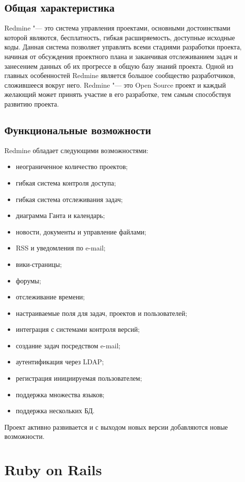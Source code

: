 \subsection{Общая характеристика}
Redmine \cite{redmine} "--- это система управления проектами, основными
достоинствами которой являются, бесплатность, гибкая расширяемость, доступные
исходные коды. Данная система позволяет управлять всеми стадиями разработки
проекта, начиная от обсуждения проектного плана и заканчивая отслеживанием
задач и занесением данных об их прогрессе в общую базу знаний проекта. Одной из
главных особенностей Redmine является большое сообщество разработчиков,
сложившееся вокруг него. Redmine "--- это Open Source проект и каждый желающий
может принять участие в его разработке, тем самым способствуя развитию проекта.

\subsection{Функциональные возможности}
Redmine обладает следующими возможностями:
\begin{itemize}
  \item неограниченное количество проектов;
  \item гибкая система контроля доступа;
  \item гибкая система отслеживания задач;
  \item диаграмма Ганта и календарь;
  \item новости, документы и управление файлами;
  \item RSS и уведомления по e-mail;
  \item вики-страницы;
  \item форумы;
  \item отслеживание времени;
  \item настраиваемые поля для задач, проектов и пользователей;
  \item интеграция с системами контроля версий;
  \item создание задач посредством e-mail;
  \item аутентификация через LDAP;
  \item регистрация инициируемая пользователем;
  \item поддержка множества языков;
  \item поддержка нескольких БД.
\end{itemize}
Проект активно развивается и с выходом новых версии добавляются новые
возможности.

\section{Ruby on Rails}

